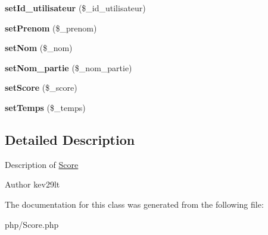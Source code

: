 \begin{DoxyCompactItemize}
{\bfseries set\+Id\+\_\+utilisateur} (\$\+\_\+id\+\_\+utilisateur)
\item 
\mbox{\label{class_score_a15debc4cd168eeddc89a19a4b83356ef}} 
{\bfseries set\+Prenom} (\$\+\_\+prenom)
\item 
\mbox{\label{class_score_aafe56564a4593df7cd5630b89f635697}} 
{\bfseries set\+Nom} (\$\+\_\+nom)
\item 
\mbox{\label{class_score_af6c36317202690a956691f87d607188c}} 
{\bfseries set\+Nom\+\_\+partie} (\$\+\_\+nom\+\_\+partie)
\item 
\mbox{\label{class_score_a989800be128d471abb7c4dbb184b8154}} 
{\bfseries set\+Score} (\$\+\_\+score)
\item 
\mbox{\label{class_score_a36713bbe32fc4795bc155ee6aa370a00}} 
{\bfseries set\+Temps} (\$\+\_\+temps)
\end{DoxyCompactItemize}


\subsection{Detailed Description}
Description of \mbox{\hyperlink{class_score}{Score}}

\begin{DoxyAuthor}{Author}
kev29lt 
\end{DoxyAuthor}


The documentation for this class was generated from the following file\+:\begin{DoxyCompactItemize}
\item 
php/Score.\+php\end{DoxyCompactItemize}
